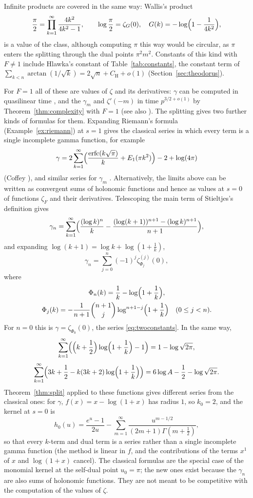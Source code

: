 \documentclass[11pt,reqno]{amsart}
\theoremstyle{definition}
\theoremstyle{remark}
\newcommand{\erfc}{\operatorname{erfc}}
\begin{document}
Infinite products are covered in the same way: Wallis's product
\[
  \frac\pi2 = \prod_{k=1}^{\infty}\frac{4k^2}{4k^2-1}, \qquad \log\frac\pi2 = \zeta_G(0), \quad
  G(k) = -\log\Bigl(1-\frac1{4k^2}\Bigr),
\]
is a value of the class, although computing $\pi$ this way would be circular, as $\pi$ enters the splitting through
the dual points $\pi^2m^2$. Constants of this kind with $F \ne 1$ include Hlawka's constant of Table~\ref{tab:constants},
the constant term of $\sum_{k<n}\arctan(1/\sqrt k) = 2\sqrt n + C_{\mathrm H} + o(1)$ (Section~\ref{sec:theodorus}).



For $F = 1$ all of these are values of $\zeta$ and its derivatives: $\gamma$ can be computed in quasilinear time
\cite{BM80}, and the $\gamma_m$ and $\zeta'(-m)$ in time $p^{3/2+o(1)}$ by Theorem~\ref{thm:complexity} with $F = 1$
(see also \cite{Joh21}). The splitting gives two further kinds of formulas for them. Expanding Riemann's formula
(Example~\ref{ex:riemann}) at $s = 1$ gives the classical series in which every term is a single incomplete gamma
function, for example
\[
  \gamma = 2\sum_{k=1}^{\infty}\Bigl(\frac{\erfc(k\sqrt\pi)}{k} + E_1(\pi k^2)\Bigr) - 2 + \log(4\pi)
\]
(Coffey \cite[Proposition~9]{Cof14}), and similar series for $\gamma_m$ \cite{Cof14}. Alternatively, the limits above
can be written as convergent sums of holonomic functions and hence as values at $s = 0$ of functions $\zeta_F$ and
their derivatives. Telescoping the main term of Stieltjes's definition gives
\[
  \gamma_n = \sum_{k=1}^{\infty}\Bigl(\frac{(\log k)^n}k - \frac{(\log(k+1))^{n+1} - (\log k)^{n+1}}{n+1}\Bigr),
\]
and expanding $\log(k+1) = \log k + \log(1+\frac1k)$,
\[
  \gamma_n = \sum_{j=0}^{n}(-1)^j\zeta_{\Phi_j}^{(j)}(0),
\]
where
\begin{gather*}
  \Phi_n(k) = \frac1k - \log\Bigl(1+\frac1k\Bigr), \\
  \Phi_j(k) = -\frac{1}{n+1}\binom{n+1}{j}\log^{n+1-j}\Bigl(1+\frac1k\Bigr) \quad (0 \le j < n).
\end{gather*}
For $n = 0$ this is $\gamma = \zeta_{\Phi_0}(0)$, the series \eqref{eq:twoconstants}. In the same way,
\[
  \sum_{k=1}^{\infty}\Bigl(\Bigl(k + \frac12\Bigr)\log\Bigl(1+\frac1k\Bigr) - 1\Bigr) = 1 - \log\sqrt{2\pi},
\]
\[
  \sum_{k=1}^{\infty}\Bigl(3k + \frac12 - k(3k+2)\log\Bigl(1+\frac1k\Bigr)\Bigr) = 6\log A - \frac12 - \log\sqrt{2\pi}.
\]
Theorem~\ref{thm:split} applied to these functions gives different series from the classical ones: for $\gamma$,
$f(x) = x - \log(1+x)$ has radius $1$, so $k_0 = 2$, and the kernel at $s = 0$ is
\[
  h_0(u) = \frac{e^u-1}{2u} - \sum_{m=1}^{\infty}\frac{u^{m-1/2}}{(2m+1)\Gamma(m+\frac12)},
\]
so that every $k$-term and dual term is a series rather than a single incomplete gamma function (the method is linear
in $f$, and the contributions of the terms $x^1$ of $x$ and $\log(1+x)$ cancel). The classical formulas are the
special case of the monomial kernel at the self-dual point $u_0 = \pi$; the new ones exist because the $\gamma_n$ are
also sums of holonomic functions. They are not meant to be competitive with the computation of the values of $\zeta$.
\end{document}
